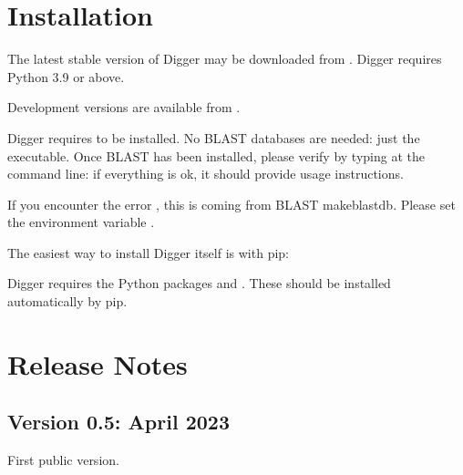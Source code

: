 \documentclass[letterpaper,10pt,english]{sphinxmanual}
\begin{document}
\sphinxstepscope


\chapter{Installation}
\label{\detokenize{install:installation}}\label{\detokenize{install:install}}\label{\detokenize{install::doc}}
\sphinxAtStartPar
The latest stable version of Digger may be downloaded from . Digger requires Python 3.9 or above.

\sphinxAtStartPar
Development versions are available from .

\sphinxAtStartPar
Digger requires  to be installed.
No BLAST databases are needed: just the executable. Once BLAST has been installed, please verify by typing  at the command line: if everything is ok, it should provide
usage instructions.

\sphinxAtStartPar
If you encounter the error , this is coming from BLAST makeblastdb. Please set the environment variable .

\sphinxAtStartPar
The easiest way to install Digger itself is with pip:

\begin{sphinxVerbatim}[commandchars=\\\{\}]
    
\end{sphinxVerbatim}

\sphinxAtStartPar
Digger requires the Python packages  and . These should be installed automatically by pip.

\sphinxstepscope


\chapter{Release Notes}
\label{\detokenize{news:release-notes}}\label{\detokenize{news:news}}\label{\detokenize{news::doc}}

\section{Version 0.5: April 2023}
\label{\detokenize{news:version-0-5-april-2023}}
\sphinxAtStartPar
First public version.
\end{document}
